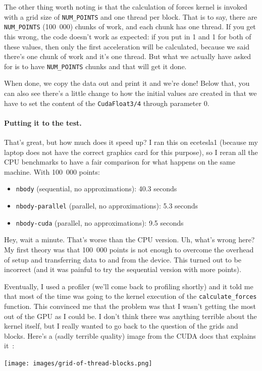 The other thing worth noting is that the calculation of forces kernel is invoked with a grid size of \texttt{NUM\_POINTS} and one thread per block. That is to say, there are \texttt{NUM\_POINTS} (100~000) chunks of work, and each chunk has one thread. If you get this wrong, the code doesn't work as expected: if you put in 1 and 1 for both of these values, then only the first acceleration will be calculated, because we said there's one chunk of work and it's one thread. But what we actually have asked for is to have \texttt{NUM\_POINTS} chunks and that will get it done.

When done, we copy the data out and print it and we're done! Below that, you can also see there's a little change to how the initial values are created in that we have to set the content of the \texttt{CudaFloat3/4} through parameter 0. 

\paragraph{Putting it to the test.}
That's great, but how much does it speed up? I ran this on ecetesla1 (because my laptop does not have the correct graphics card for this purpose), so I reran all the CPU benchmarks to have a fair comparison for what happens on the same machine. With 100~000 points:
\begin{itemize}
	\item \texttt{nbody} (sequential, no approximations): 40.3 seconds\vspace{-1em}
	\item \texttt{nbody-parallel} (parallel, no approximations): 5.3 seconds\vspace{-1em}
	\item \texttt{nbody-cuda} (parallel, no approximations): 9.5 seconds
\end{itemize}

Hey, wait a minute. That's worse than the CPU version. Uh, what's wrong here? My first theory was that 100~000 points is not enough to overcome the overhead of setup and transferring data to and from the device. This turned out to be incorrect (and it was painful to try the sequential version with more points). 

Eventually, I used a profiler (we'll come back to profiling shortly) and it told me that most of the time was going to the kernel execution of the \texttt{calculate\_forces} function. This convinced me that the problem was that I wasn't getting the most out of the GPU as I could be. I don't think there was anything terrible about the kernel itself, but I really wanted to go back to the question of the grids and blocks. Here's a (sadly terrible quality) image from the CUDA docs that explains it~\cite{cuda}:
\begin{center}
	\texttt{[image: images/grid-of-thread-blocks.png]}
\end{center}

